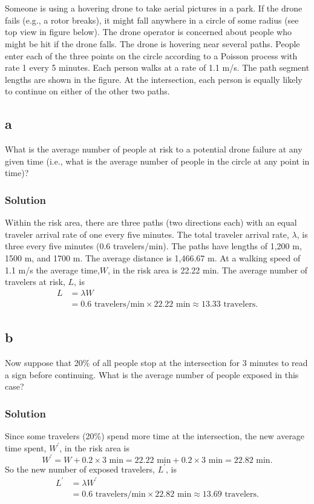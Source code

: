 \documentclass[letterpaper]{amsart}
\begin{document}
\section{} %
Someone is using a hovering drone to take aerial pictures in a park. If the drone fails
(e.g., a rotor breaks), it might fall anywhere in a circle of some radius (see top view in
figure below). The drone operator is concerned about people who might be hit if the
drone falls. The drone is hovering near several paths. People enter each of the three
points on the circle according to a Poisson process with rate 1 every 5 minutes. Each
person walks at a rate of 1.1 m/s. The path segment lengths are shown in the figure. At
the intersection, each person is equally likely to continue on either of the other two paths.

\subsection*{a}
What is the average number of people at risk to a potential drone failure at any given
time (i.e., what is the average number of people in the circle at any point in time)?
\subsubsection*{Solution}
Within the risk area, there are three paths (two directions each) with an equal
traveler arrival rate of one every five minutes. The total traveler arrival
rate, $\lambda$, is three every five minutes (0.6 travelers/min). The paths
have lengths of 1,200 m, 1500 m, and 1700 m. The average distance is 1,466.67 m.
At a walking speed of 1.1 m/s the average time,$W$, in the risk area is 22.22 min.
The average number of travelers at risk, $L$, is
\begin{align}
  L &= \lambda W \\
    &= 0.6\text{ travelers/min} \times 22.22\text{ min}\approx13.33\text{ travelers}.
\end{align}

\subsection*{b}
Now suppose that 20\% of all people stop at the intersection for 3 minutes to read a
sign before continuing. What is the average number of people exposed in this case?
\subsubsection*{Solution}
Since some travelers (20\%) spend more time at the intersection, the new average time
spent, $W^\prime$, in the risk area is
\begin{equation}
  W^\prime = W + 0.2 \times 3\text{ min} = 22.22\text{ min} + 0.2 \times 3\text{ min}
  = 22.82\text{ min}.
\end{equation}
So the new number of exposed travelers, $L^\prime$, is
\begin{align}
  L^\prime &= \lambda W^\prime \\
    &= 0.6\text{ travelers/min} \times 22.82\text{ min}\approx13.69\text{ travelers}.
\end{align}
\end{document}
